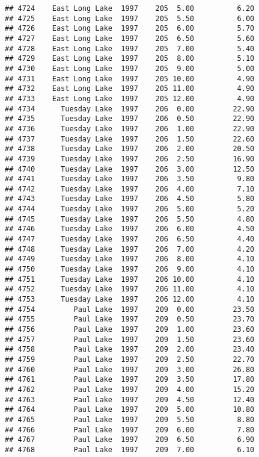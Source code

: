 \documentclass[
]{article}
\begin{document}
\begin{verbatim}
## 4724    East Long Lake  1997    205  5.00          6.20
## 4725    East Long Lake  1997    205  5.50          6.00
## 4726    East Long Lake  1997    205  6.00          5.70
## 4727    East Long Lake  1997    205  6.50          5.60
## 4728    East Long Lake  1997    205  7.00          5.40
## 4729    East Long Lake  1997    205  8.00          5.10
## 4730    East Long Lake  1997    205  9.00          5.00
## 4731    East Long Lake  1997    205 10.00          4.90
## 4732    East Long Lake  1997    205 11.00          4.90
## 4733    East Long Lake  1997    205 12.00          4.90
## 4734      Tuesday Lake  1997    206  0.00         22.90
## 4735      Tuesday Lake  1997    206  0.50         22.90
## 4736      Tuesday Lake  1997    206  1.00         22.90
## 4737      Tuesday Lake  1997    206  1.50         22.60
## 4738      Tuesday Lake  1997    206  2.00         20.50
## 4739      Tuesday Lake  1997    206  2.50         16.90
## 4740      Tuesday Lake  1997    206  3.00         12.50
## 4741      Tuesday Lake  1997    206  3.50          9.80
## 4742      Tuesday Lake  1997    206  4.00          7.10
## 4743      Tuesday Lake  1997    206  4.50          5.80
## 4744      Tuesday Lake  1997    206  5.00          5.20
## 4745      Tuesday Lake  1997    206  5.50          4.80
## 4746      Tuesday Lake  1997    206  6.00          4.50
## 4747      Tuesday Lake  1997    206  6.50          4.40
## 4748      Tuesday Lake  1997    206  7.00          4.20
## 4749      Tuesday Lake  1997    206  8.00          4.10
## 4750      Tuesday Lake  1997    206  9.00          4.10
## 4751      Tuesday Lake  1997    206 10.00          4.10
## 4752      Tuesday Lake  1997    206 11.00          4.10
## 4753      Tuesday Lake  1997    206 12.00          4.10
## 4754         Paul Lake  1997    209  0.00         23.50
## 4755         Paul Lake  1997    209  0.50         23.70
## 4756         Paul Lake  1997    209  1.00         23.60
## 4757         Paul Lake  1997    209  1.50         23.60
## 4758         Paul Lake  1997    209  2.00         23.40
## 4759         Paul Lake  1997    209  2.50         22.70
## 4760         Paul Lake  1997    209  3.00         26.80
## 4761         Paul Lake  1997    209  3.50         17.80
## 4762         Paul Lake  1997    209  4.00         15.20
## 4763         Paul Lake  1997    209  4.50         12.40
## 4764         Paul Lake  1997    209  5.00         10.80
## 4765         Paul Lake  1997    209  5.50          8.80
## 4766         Paul Lake  1997    209  6.00          7.80
## 4767         Paul Lake  1997    209  6.50          6.90
## 4768         Paul Lake  1997    209  7.00          6.10

\end{verbatim}
\end{document}
